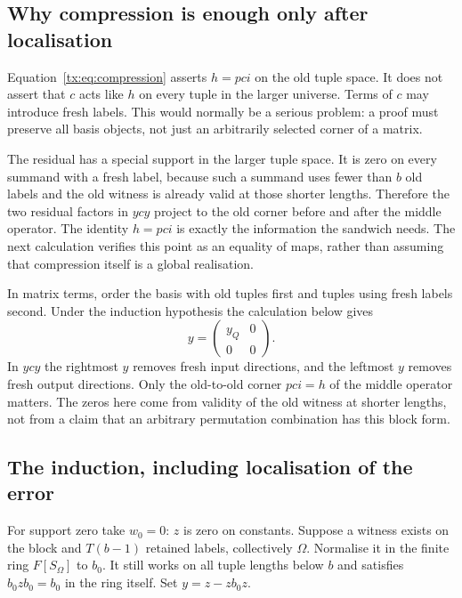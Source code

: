 \documentclass[11pt,a4paper,oneside,openany]{book}
\theoremstyle{definition}\newtheorem{definition}[theorem]{Definition}
\theoremstyle{remark}\newtheorem{remark}[theorem]{Remark}
\numberwithin{equation}{chapter}
\begin{document}
\subsection{Why compression is enough only after localisation}
Equation~\eqref{tx:eq:compression} asserts $h=pci$ on the old tuple
space. It does not assert that $c$ acts like $h$ on every tuple in
the larger universe. Terms of $c$ may introduce fresh labels. This
would normally be a serious problem: a proof must preserve all basis
objects, not just an arbitrarily selected corner of a matrix.

The residual has a special support in the larger tuple space. It is
zero on every summand with a fresh label, because such a summand uses
fewer than $b$ old labels and the old witness is already valid at
those shorter lengths. Therefore the two residual factors in
$ycy$ project to the old corner before and after the middle operator.
The identity $h=pci$ is exactly the information the sandwich needs.
The next calculation verifies this point as an equality of maps,
rather than assuming that compression itself is a global realisation.

In matrix terms, order the basis with old tuples first and tuples
using fresh labels second. Under the induction hypothesis the
calculation below gives
\[
                       y=\begin{pmatrix}y_Q&0\\0&0\end{pmatrix}.
\]
In $ycy$ the rightmost $y$ removes fresh input directions, and the
leftmost $y$ removes fresh output directions. Only the old-to-old
corner $pci=h$ of the middle operator matters. The zeros here come
from validity of the old witness at shorter lengths, not from a
claim that an arbitrary permutation combination has this block form.

\subsection{The induction, including localisation of the error}
For support zero take $w_0=0$: $z$ is zero on constants. Suppose a witness exists on the block and $T(b-1)$ retained labels, collectively $\Omega$. Normalise it in the finite ring $F[S_\Omega]$ to $b_0$. It still works on all tuple lengths below $b$ and satisfies $b_0zb_0=b_0$ in the ring itself. Set $y=z-zb_0z$.
\end{document}
